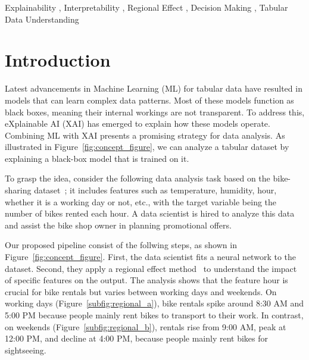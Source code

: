 \documentclass[
twocolumn,
]{ceurart}
\begin{document}
\begin{keywords}
  Explainability \sep
  Interpretability \sep
  Regional Effect \sep
  Decision Making \sep
  Tabular Data Understanding
\end{keywords}

\maketitle


\section{Introduction}
\label{sec:introduction}

Latest advancements in Machine Learning (ML) for tabular data have resulted in models that can learn complex data patterns.
Most of these models function as black boxes, meaning their internal workings are not transparent.
To address this, eXplainable AI (XAI) has emerged to explain how these models operate.
Combining ML with XAI presents a promising strategy for data analysis. As illustrated in Figure~\ref{fig:concept_figure}, we can analyze a tabular dataset by explaining a black-box model that is trained on it.

To grasp the idea, consider the following data analysis task based on the bike-sharing dataset~\cite{fanaee2014event}; it includes features such as temperature, humidity, hour, whether it is a working day or not, etc., with the target variable being the number of bikes rented each hour. A data scientist is hired to analyze this data and assist the bike shop owner in planning promotional offers.

Our proposed pipeline consist of the follwing steps, as shown in Figure~\ref{fig:concept_figure}. First, the data scientist fits a neural network to the dataset. Second, they apply a regional effect method~\cite{herbinger2023decomposing, herbinger_repid_2022} to understand the impact of specific features on the output. The analysis shows that the feature hour is crucial for bike rentals but varies between working days and weekends. On working days (Figure~\ref{subfig:regional_a}), bike rentals spike around 8:30 AM and 5:00 PM because people mainly rent bikes to transport to their work. In contrast, on weekends (Figure~\ref{subfig:regional_b}), rentals rise from 9:00 AM, peak at 12:00 PM, and decline at 4:00 PM, because people mainly rent bikes for sightseeing. 
\end{document}

